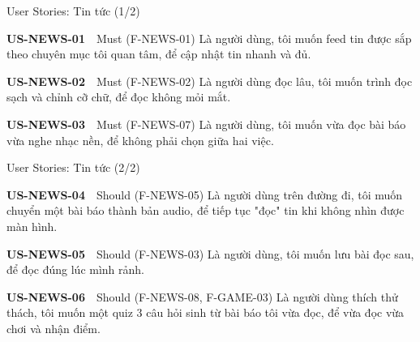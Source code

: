 \begin{frame}{User Stories: Tin tức (1/2)}
\linespread{0.85}
\begin{block}{\scriptsize\bfseries US-NEWS-01}~~Must \tiny(F-NEWS-01)
{\scriptsize Là người dùng, tôi muốn feed tin được sắp theo chuyên mục tôi quan tâm, để cập nhật tin nhanh và đủ.}
\end{block}
\vspace{1pt}
\begin{block}{\scriptsize\bfseries US-NEWS-02}~~Must \tiny(F-NEWS-02)
{\scriptsize Là người dùng đọc lâu, tôi muốn trình đọc sạch và chỉnh cỡ chữ, để đọc không mỏi mắt.}
\end{block}
\vspace{1pt}
\begin{block}{\scriptsize\bfseries US-NEWS-03}~~Must \tiny(F-NEWS-07)
{\scriptsize Là người dùng, tôi muốn vừa đọc bài báo vừa nghe nhạc nền, để không phải chọn giữa hai việc.}
\end{block}
\vspace{1pt}
\end{frame}

\begin{frame}{User Stories: Tin tức (2/2)}
\linespread{0.85}
\begin{block}{\scriptsize\bfseries US-NEWS-04}~~Should \tiny(F-NEWS-05)
{\scriptsize Là người dùng trên đường đi, tôi muốn chuyển một bài báo thành bản audio, để tiếp tục "đọc" tin khi không nhìn được màn hình.}
\end{block}
\vspace{1pt}
\begin{block}{\scriptsize\bfseries US-NEWS-05}~~Should \tiny(F-NEWS-03)
{\scriptsize Là người dùng, tôi muốn lưu bài đọc sau, để đọc đúng lúc mình rảnh.}
\end{block}
\vspace{1pt}
\begin{block}{\scriptsize\bfseries US-NEWS-06}~~Should \tiny(F-NEWS-08, F-GAME-03)
{\scriptsize Là người dùng thích thử thách, tôi muốn một quiz 3 câu hỏi sinh từ bài báo tôi vừa đọc, để vừa đọc vừa chơi và nhận điểm.}
\end{block}
\vspace{1pt}
\end{frame}

